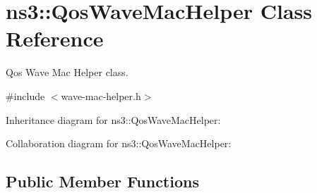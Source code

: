 \hypertarget{classns3_1_1QosWaveMacHelper}{}\section{ns3\+:\+:Qos\+Wave\+Mac\+Helper Class Reference}
\label{classns3_1_1QosWaveMacHelper}


Qos Wave Mac Helper class.  




{\ttfamily \#include $<$wave-\/mac-\/helper.\+h$>$}



Inheritance diagram for ns3\+:\+:Qos\+Wave\+Mac\+Helper\+:


Collaboration diagram for ns3\+:\+:Qos\+Wave\+Mac\+Helper\+:
\subsection*{Public Member Functions}
